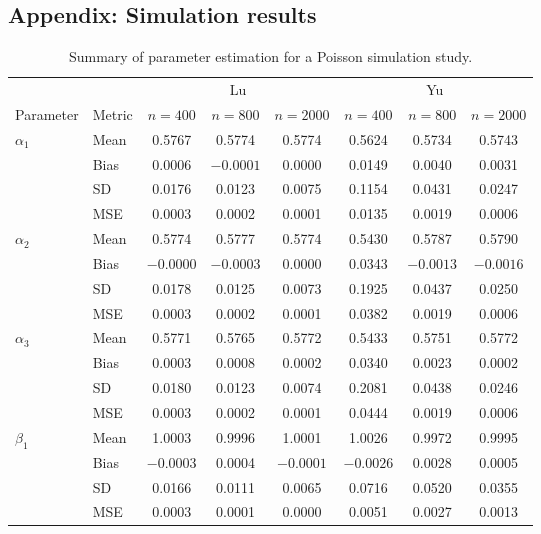 \subsection{Appendix: Simulation results}

\begin{table}[H]
\centering
\begin{threeparttable}
\caption{Summary of parameter estimation for a Poisson simulation study.}
\label{tab:sim_param_pois_extended}
\begin{tabular}{llcccccc}
\toprule
& & \multicolumn{3}{c}{Lu} & \multicolumn{3}{c}{Yu} \\
\cmidrule(lr){3-5} \cmidrule(lr){6-8}
Parameter & Metric 
& $n=400$ & $n=800$ & $n=2000$
& $n=400$ & $n=800$ & $n=2000$ \\
\midrule

\multirow{4}{*}{$\alpha_{1}$}
& Mean & 0.5767 & 0.5774 & 0.5774 & 0.5624 & 0.5734 & 0.5743 \\
& Bias & 0.0006 & $-0.0001$ & 0.0000 & 0.0149 & 0.0040 & 0.0031 \\
& SD   & 0.0176 & 0.0123 & 0.0075 & 0.1154 & 0.0431 & 0.0247 \\
& MSE  & 0.0003 & 0.0002 & 0.0001 & 0.0135 & 0.0019 & 0.0006 \\
\midrule

\multirow{4}{*}{$\alpha_{2}$}
& Mean & 0.5774 & 0.5777 & 0.5774 & 0.5430 & 0.5787 & 0.5790 \\
& Bias & $-0.0000$ & $-0.0003$ & 0.0000 & 0.0343 & $-0.0013$ & $-0.0016$ \\
& SD   & 0.0178 & 0.0125 & 0.0073 & 0.1925 & 0.0437 & 0.0250 \\
& MSE  & 0.0003 & 0.0002 & 0.0001 & 0.0382 & 0.0019 & 0.0006 \\
\midrule

\multirow{4}{*}{$\alpha_{3}$}
& Mean & 0.5771 & 0.5765 & 0.5772 & 0.5433 & 0.5751 & 0.5772 \\
& Bias & 0.0003 & 0.0008 & 0.0002 & 0.0340 & 0.0023 & 0.0002 \\
& SD   & 0.0180 & 0.0123 & 0.0074 & 0.2081 & 0.0438 & 0.0246 \\
& MSE  & 0.0003 & 0.0002 & 0.0001 & 0.0444 & 0.0019 & 0.0006 \\
\midrule

\multirow{4}{*}{$\beta_{1}$}
& Mean & 1.0003 & 0.9996 & 1.0001 & 1.0026 & 0.9972 & 0.9995 \\
& Bias & $-0.0003$ & 0.0004 & $-0.0001$ & $-0.0026$ & 0.0028 & 0.0005 \\
& SD   & 0.0166 & 0.0111 & 0.0065 & 0.0716 & 0.0520 & 0.0355 \\
& MSE  & 0.0003 & 0.0001 & 0.0000 & 0.0051 & 0.0027 & 0.0013 \\
\midrule


\end{tabular}
\end{threeparttable}
\end{table}
